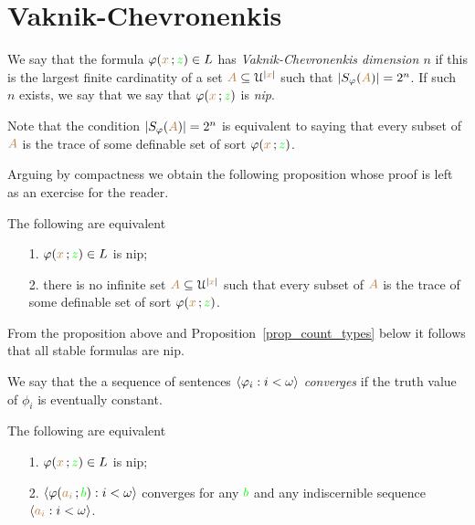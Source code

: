 \documentclass[creche.tex]{subfiles}
\begin{document}
\section{Vaknik-Chevronenkis}
\label{approximable}

\def\ceq#1#2#3{\parbox{25ex}{$\displaystyle #1$}\medrel{#2}$\displaystyle  #3$}

We say that the formula $\varphi({\color{brown} x}\,;{\color{green} z})\in L$ has \emph{Vaknik-Chevronenkis dimension $n$\/} if this is the largest finite cardinatity of a set ${\color{brown} A}\subseteq\EuScript U^{|{\color{brown} x}|}$ such that $|S_\varphi({\color{brown} A})|=2^n$. If such $n$ exists, we say that we say that  $\varphi({\color{brown} x}\,;{\color{green} z})$ is \emph{nip}. 

Note that the condition $|S_\varphi({\color{brown} A})|=2^n$ is equivalent to saying that every subset of ${\color{brown} A}$ is the trace of some definable set of sort $\varphi({\color{brown} x}\,;{\color{green} z})$.

Arguing by compactness we obtain the following proposition whose proof is left as an exercise for the reader.

\begin{proposition}
The following are equivalent 
\begin{itemize}
\item[1.] $\varphi({\color{brown} x}\,;{\color{green} z})\in L$ is nip;
\item[2.] there is no infinite set ${\color{brown} A}\subseteq\EuScript U^{|{\color{brown} x}|}$ such that  every subset of ${\color{brown} A}$ is the trace of some definable set of sort $\varphi({\color{brown} x}\,;{\color{green} z})$.\QED
\end{itemize}
\end{proposition}

From the proposition above and Proposition~\ref{prop_count_types} below it follows that all stable formulas are nip.

We say that the a sequence of sentences $\langle\varphi_i:i<\omega\rangle$ \emph{converges\/} if the truth value of $\phi_i$ is eventually constant.  

\begin{lemma}\label{lem_altrank}
The following are equivalent
\begin{itemize}
\item[1.] $\varphi({\color{brown} x}\,;{\color{green} z})\in L$ is nip;
\item[2.] $\langle\varphi({\color{brown} a_i}\,;{\color{green} b}):i<\omega\rangle$ converges for any ${\color{green} b}$ and any indiscernible sequence $\langle{\color{brown}a_i}:i<\omega\rangle$.
\end{itemize}
\end{lemma}
\end{document}
